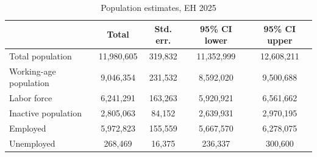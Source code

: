 \begin{table}[htbp]\centering
\def\sym#1{\ifmmode^{#1}\else\(^{#1}\)\fi}
\caption{Population estimates, EH 2025}
\begin{tabular}{l*{1}{cccc}}
\toprule
            &       Total&   Std. err.&95\% CI lower&95\% CI upper\\
\midrule
Total population&  11,980,605&     319,832&  11,352,999&  12,608,211\\
Working-age population&   9,046,354&     231,532&   8,592,020&   9,500,688\\
Labor force &   6,241,291&     163,263&   5,920,921&   6,561,662\\
Inactive population&   2,805,063&      84,152&   2,639,931&   2,970,195\\
Employed    &   5,972,823&     155,559&   5,667,570&   6,278,075\\
Unemployed  &     268,469&      16,375&     236,337&     300,600\\
\bottomrule
\end{tabular}
\end{table}
